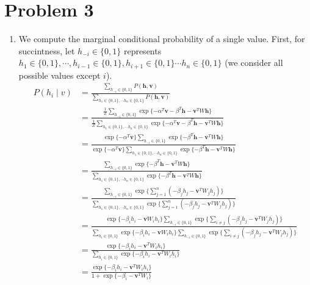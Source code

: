 \documentclass[12pt]{article}
\begin{document}
\section*{Problem 3}

\begin{enumerate}[label=(\alph*)]
\item We compute the marginal conditional probability of a single value. First, for succintness, let $h_{-i} \in \{0,1\}$ represents $h_1 \in \{0,1\}, \cdots, h_{i-1} \in \{0,1\}, h_{i+1}\in \{0,1\} \cdots h_n \in \{0,1\}$ (we consider all possible values except $i$).
\begin{align*}
P(h_i \mid v) &= \frac{\sum_{h_{-i} \in \{0,1\}} P(\textbf{h}, \textbf{v})}{\sum_{h_1 \in \{0,1\}, \cdots h_n \in \{0,1\}} P(\textbf{h}, \textbf{v})} \\
&= \frac{\frac{1}{Z}\sum_{h_{-i} \in \{0,1\}} \exp\{-\alpha^T\textbf{v} - \beta^T \textbf{h} - \textbf{v}^TW\textbf{h}\}}{\frac{1}{Z}\sum_{h_1 \in \{0,1\}, \cdots h_n \in \{0,1\}} \exp\{-\alpha^T\textbf{v} - \beta^T \textbf{h} - \textbf{v}^TW\textbf{h}\}} \\
&= \frac{\exp\{-\alpha^T \textbf{v}\}\sum_{h_{-i} \in \{0,1\}} \exp\{- \beta^T \textbf{h} - \textbf{v}^TW\textbf{h}\}}{\exp\{-\alpha^T \textbf{v}\}\sum_{h_1 \in \{0,1\}, \cdots h_n \in \{0,1\}} \exp\{- \beta^T \textbf{h} - \textbf{v}^TW\textbf{h}\}} \\
&= \frac{\sum_{h_{-i} \in \{0,1\}} \exp\{- \beta^T \textbf{h} - \textbf{v}^TW\textbf{h}\}}{\sum_{h_1 \in \{0,1\}, \cdots h_n \in \{0,1\}} \exp\{- \beta^T \textbf{h} - \textbf{v}^TW\textbf{h}\}} \\
&= \frac{\sum_{h_{-i} \in \{0,1\}} \exp\{\sum_{j = 1 }^n (-\beta_j h_j - \textbf{v}^TW_jh_j)\}}{\sum_{h_1 \in \{0,1\}, \cdots h_n \in \{0,1\}} \exp\{\sum_{j = 1 }^n (-\beta_j h_j - \textbf{v}^TW_jh_j)\}} \\
&= \frac{\exp\{-\beta_i h_i - \textbf{v}W_ih_i\}\sum_{h_{-i} \in \{0,1\}} \exp\{\sum_{i \neq j } (-\beta_j h_j - \textbf{v}^TW_jh_j)\}}{\sum_{h_i \in \{0,1\}}\exp\{-\beta_i h_i - \textbf{v}W_ih_i\} \sum_{h_{-i} \in \{0,1\}} \exp\{\sum_{i \neq j} (-\beta_j h_j - \textbf{v}^TW_jh_j)\}} \\
&= \frac{\exp\{-\beta_i h_i - \textbf{v}^TW_ih_i\}}{\sum_{h_i \in \{0,1\}}\exp\{-\beta_i h_i - \textbf{v}^TW_ih_i\}} \\
&= \frac{\exp\{-\beta_i h_i - \textbf{v}^TW_ih_i\}}{1 + \exp\{-\beta_i - \textbf{v}^TW_i\}}
\end{align*}


\end{enumerate}
\end{document}
